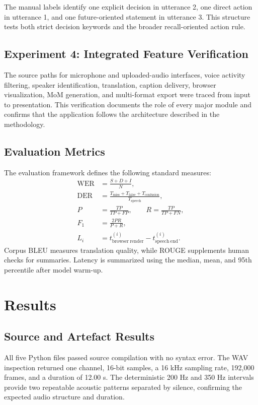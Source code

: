 \documentclass[conference]{IEEEtran}
\begin{document}
The manual labels identify one explicit decision in utterance 2, one direct action in utterance 1, and one future-oriented statement in utterance 3. This structure tests both strict decision keywords and the broader recall-oriented action rule.

\subsection{Experiment 4: Integrated Feature Verification}
The source paths for microphone and uploaded-audio interfaces, voice activity filtering, speaker identification, translation, caption delivery, browser visualization, MoM generation, and multi-format export were traced from input to presentation. This verification documents the role of every major module and confirms that the application follows the architecture described in the methodology.

\subsection{Evaluation Metrics}
The evaluation framework defines the following standard measures:
\begin{align}
\mathrm{WER} &= \frac{S+D+I}{N},\\
\mathrm{DER} &= \frac{T_{\mathrm{miss}}+T_{\mathrm{false}}+T_{\mathrm{confusion}}}{T_{\mathrm{speech}}},\\
P &= \frac{TP}{TP+FP}, \qquad R=\frac{TP}{TP+FN},\\
F_1 &= \frac{2PR}{P+R},\\
L_i &= t^{(i)}_{\mathrm{browser\ render}}-t^{(i)}_{\mathrm{speech\ end}}.
\end{align}
Corpus BLEU measures translation quality, while ROUGE supplements human checks for summaries. Latency is summarized using the median, mean, and 95th percentile after model warm-up.

\section{Results}

\subsection{Source and Artefact Results}
All five Python files passed source compilation with no syntax error. The WAV inspection returned one channel, 16-bit samples, a 16 kHz sampling rate, 192,000 frames, and a duration of 12.00 s. The deterministic 200 Hz and 350 Hz intervals provide two repeatable acoustic patterns separated by silence, confirming the expected audio structure and duration.
\end{document}
